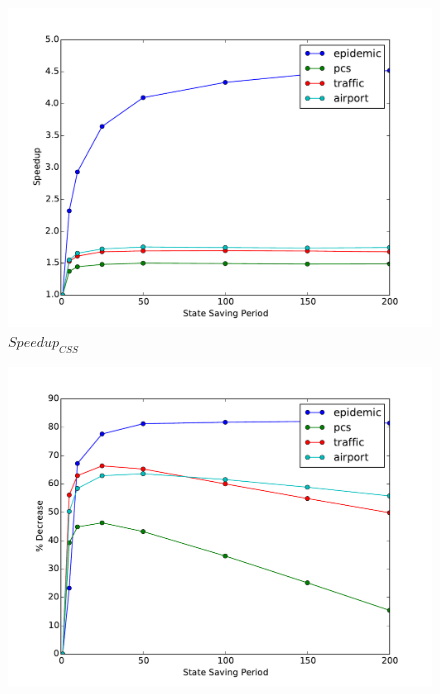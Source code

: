 \documentclass[11pt]{book}
\begin{document}
\begin{figure}
  \begin{minipage}{.5\textwidth}
    \begin{center}
      \includegraphics[width=\textwidth,keepaspectratio,quiet]{figs/state_saving/speedup.pdf} \\
      $Speedup_{CSS}$ \\
    \end{center}
  \end{minipage}%
  \hfill
  \begin{minipage}{.5\textwidth}
    \begin{center}
      \includegraphics[width=\textwidth,keepaspectratio,quiet]{figs/state_saving/percent_memory_decrease.pdf} \\

\end{center}
\end{minipage}
\end{figure}
\end{document}
